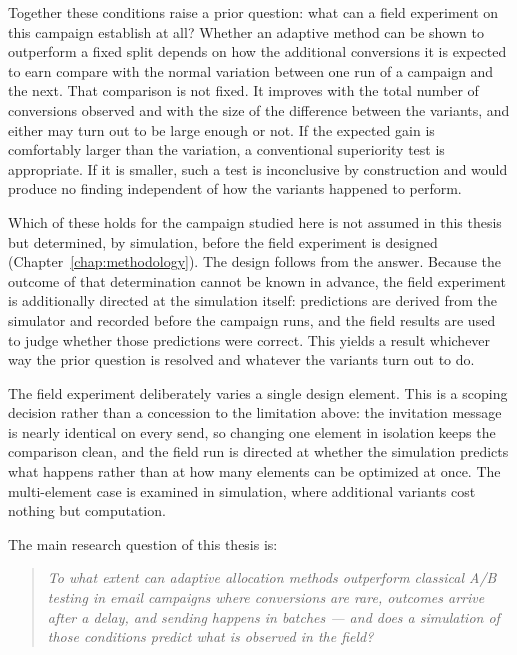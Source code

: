 Together these conditions raise a prior question: what can a field experiment on this campaign establish at all? Whether an adaptive method can be shown to outperform a fixed split depends on how the additional conversions it is expected to earn compare with the normal variation between one run of a campaign and the next. That comparison is not fixed. It improves with the total number of conversions observed and with the size of the difference between the variants, and either may turn out to be large enough or not. If the expected gain is comfortably larger than the variation, a conventional superiority test is appropriate. If it is smaller, such a test is inconclusive by construction and would produce no finding independent of how the variants happened to perform.

Which of these holds for the campaign studied here is not assumed in this thesis but determined, by simulation, before the field experiment is designed (Chapter~\ref{chap:methodology}). The design follows from the answer. Because the outcome of that determination cannot be known in advance, the field experiment is additionally directed at the simulation itself: predictions are derived from the simulator and recorded before the campaign runs, and the field results are used to judge whether those predictions were correct. This yields a result whichever way the prior question is resolved and whatever the variants turn out to do.

The field experiment deliberately varies a single design element. This is a scoping decision rather than a concession to the limitation above: the invitation message is nearly identical on every send, so changing one element in isolation keeps the comparison clean, and the field run is directed at whether the simulation predicts what happens rather than at how many elements can be optimized at once. The multi-element case is examined in simulation, where additional variants cost nothing but computation.

\vspace{1.0cm}

\noindent The main research question of this thesis is:

\begin{quote}
\textit{To what extent can adaptive allocation methods outperform classical A/B
testing in email campaigns where conversions are rare, outcomes arrive after a
delay, and sending happens in batches --- and does a simulation of those
conditions predict what is observed in the field?}
\end{quote}

